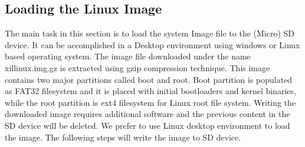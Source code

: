 \subsection{Loading the Linux Image}
The main task in this section is to load the system Image file to the (Micro) SD device. It can be accomplished in a Desktop environment using windows or Linux based operating system. The image file downloaded under the name xillinux.img.gz is extracted using gzip compression technique. This image contains two major partitions called boot and root. Boot partition is populated as FAT32 filesystem and it is placed with initial bootloaders and kernel binaries, while the root partition is ext4 filesystem for Linux root file system. Writing the downloaded image requires additional software and the previous content in the SD device will be deleted. We prefer to use Linux desktop environment to load the image. The following steps will write the image to SD device.
